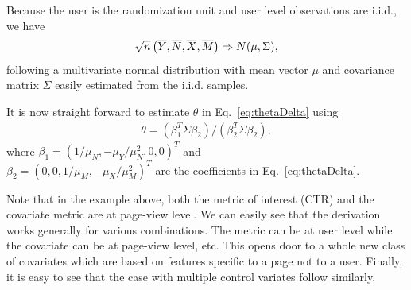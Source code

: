 \documentclass{sig-alternate}
\begin{document}
Because the user is the randomization unit and user level observations are i.i.d., we have 
\begin{align*}
\sqrt{n}\left(\overline{Y}, \overline{N},\overline{X}, \overline{M}\right)\Rightarrow N(\mu, \Sigma),
\end{align*} 
following a multivariate normal distribution with mean vector $\mu$ and covariance matrix $\Sigma$ easily estimated from the i.i.d. samples. 

It is now straight forward to estimate $\theta$ in Eq.~\ref{eq:thetaDelta} using
\begin{align*}
\theta = (\beta_1^T\Sigma\beta_2)/(\beta_2^T\Sigma\beta_2),
\end{align*}
where $\beta_1=(1/\mu_N, -\mu_Y/\mu_N^2, 0, 0)^T$ and \\$\beta_2=(0,0,1/\mu_M, -\mu_X/\mu_M^2)^T$ are the coefficients in Eq.~\ref{eq:thetaDelta}. 

Note that in the example above, both the metric of interest (CTR) and the covariate metric are at page-view level. We can easily see that the derivation works generally for various combinations. The metric can be at user level while the covariate can be at page-view level, etc. This opens door to a whole new class of covariates which are based on features specific to a page not to a user. Finally, it is easy to see that the case with multiple control variates follow similarly. 
\end{document}
